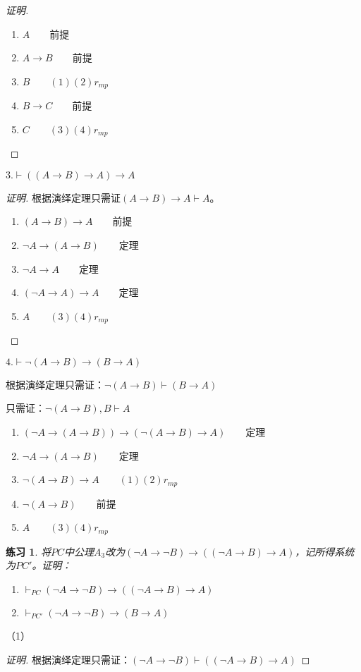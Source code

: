 \documentclass{article}
\newtheorem{Exercise}{练习}
\begin{document}
\begin{CJK*}{UTF8}{gbsn}
\begin{proof}[证明]
  \begin{enumerate}
    \item $A\qquad$前提
    \item $A\to B\qquad$前提
    \item $B\qquad(1)(2)r_{mp}$
    \item $B\to C\qquad$前提
    \item $C\qquad(3)(4)r_{mp}$
  \end{enumerate}

\end{proof}


$3.\vdash ((A\to B)\to A)\to A$

\begin{proof}[证明]
  根据演绎定理只需证$(A\to B)\to A\vdash A$。

\begin{enumerate}
  \item $(A\to B)\to A\qquad$前提
  \item $\lnot A\to (A\to B)\qquad$定理
  \item $\lnot A\to A\qquad$定理
  \item $(\lnot A\to A)\to A\qquad$定理
  \item $A\qquad(3)(4)r_{mp}\qquad$
\end{enumerate}
\end{proof}


$4.\vdash \lnot (A\to B)\to (B\to A)$

根据演绎定理只需证：$\lnot (A\to B)\vdash (B\to A)$

只需证：$\lnot (A\to B), B\vdash A$


\begin{enumerate}
  \item $(\lnot A\to (A\to B))\to (\lnot (A\to B)\to A)\qquad$定理
  \item $\lnot A\to (A\to B)\qquad$定理
  \item $\lnot(A\to B)\to A\qquad(1)(2)r_{mp}$
  \item $\lnot(A\to B)\qquad$前提
  \item $A\qquad(3)(4)r_{mp}$
\end{enumerate}

\begin{Exercise}
  将$PC$中公理$A_3$改为$(\lnot A\to \lnot B)\to ((\lnot A\to B)\to A)$，记所得系统为$PC'$。证明：
\begin{enumerate}
  \item $\vdash_{PC} (\lnot A\to \lnot B)\to ((\lnot A\to B)\to A)$
  \item $\vdash_{PC'}(\lnot A\to \lnot B)\to (B\to A)$
\end{enumerate}
\end{Exercise}
（1）\begin{proof}[证明]
  根据演绎定理只需证：$(\lnot A\to \lnot B)\vdash((\lnot A\to B)\to A)$


\end{proof}
\end{CJK*}
\end{document}
